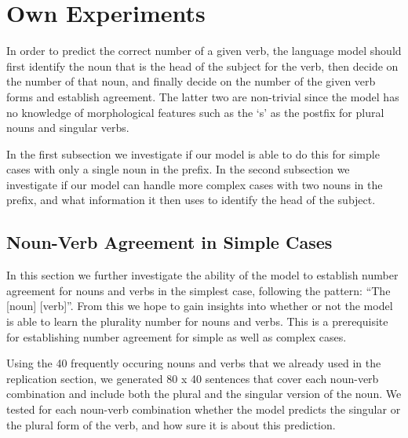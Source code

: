 \section{Own Experiments}
\label{own-experiments}
In order to predict the correct number of a given verb,
the language model should first
identify the noun that is the head of the subject for the verb,
then decide on the number of that noun,
and finally decide on the number of the given verb forms and
establish agreement.
The latter two are non-trivial since the model has no knowledge
of morphological features such as the `s' as the postfix
for plural nouns and singular verbs. 

In the first subsection we investigate if our model is able to
do this for simple cases with only a single noun in the prefix.
%
In the second subsection we investigate if our model can handle
more complex cases with two nouns in the prefix,
and what information it then uses to identify the head of the subject.


\subsection{Noun-Verb Agreement in Simple Cases}

In this section we further investigate the ability of the model to
establish number agreement for nouns and verbs in the simplest case,
following the pattern: ``The [noun] [verb]''. 
From this we hope to gain insights into whether or not the model is able 
to learn the plurality number for nouns and verbs.
This is a prerequisite for establishing number agreement
for simple as well as complex cases.

Using the 40 frequently occuring nouns and verbs that we already used in the replication section, we generated 80 x 40 sentences that cover each noun-verb combination and include both the plural and the singular version of the noun. 
We tested for each noun-verb combination whether the model 
predicts the singular or the plural form of the verb,
and how sure it is about this prediction.


